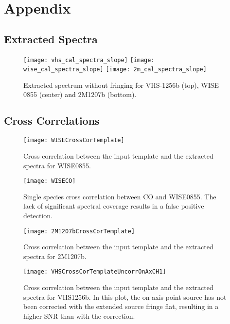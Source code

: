 \appendix
\chapter{Appendix}
\section{Extracted Spectra}\label{app:spec}
\begin{figure}[h]
	\centering
	\texttt{[image: vhs\_cal\_spectra\_slope]}
	\texttt{[image: wise\_cal\_spectra\_slope]}
	\texttt{[image: 2m\_cal\_spectra\_slope]}
	\caption{Extracted spectrum without fringing for VHS-1256b (top), WISE 0855 (center) and 2M1207b (bottom).}
\end{figure}
\clearpage
\section{Cross Correlations}
\begin{figure}[h]
	\texttt{[image: WISECrossCorTemplate]}
	\caption{Cross correlation between the input template and the extracted spectra for WISE0855.}
\end{figure}
\begin{figure}[h]
	\texttt{[image: WISECO]}
	\caption{Single species cross correlation between CO and WISE0855. The lack of significant spectral coverage results in a false positive detection.}
	\label{fig:wiseco}
\end{figure}
\begin{figure}[h]
	\texttt{[image: 2M1207bCrossCorTemplate]}
	\caption{Cross correlation between the input template and the extracted spectra for 2M1207b.}
\end{figure}
\begin{figure}[h]
	\texttt{[image: VHSCrossCorTemplateUncorrOnAxCH1]}
	\caption{Cross correlation between the input template and the extracted spectra for VHS1256b. In this plot, the on axis point source has not been corrected with the extended source fringe flat, resulting in a higher SNR than with the correction.}
\end{figure}

\clearpage
